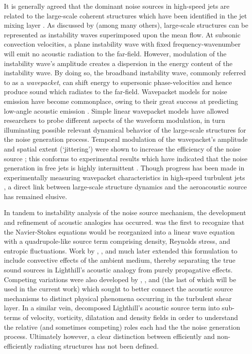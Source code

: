 It is generally agreed that the dominant noise sources in high-speed jets are related to the large-scale coherent structures which have been identified in the jet mixing layer \citep{Arndt1997}. 
As discussed by \citet{Tam1995} (among many others), large-scale structures can be represented as instability waves superimposed upon the mean flow.
At subsonic convection velocities, a plane instability wave with fixed frequency-wavenumber will emit no acoustic radiation to the far-field.
However, modulation of the instability wave's amplitude creates a dispersion in the energy content of the instability wave.
By doing so, the broadband instability wave, commonly referred to as a \emph{wavepacket}, can shift energy to supersonic phase-velocities and hence produce sound which radiates to the far-field.
Wavepacket models for noise emission have become commonplace, owing to their great success at predicting low-angle acoustic emission \citep{Obrist2011}.
Simple linear wavepacket models have allowed researchers to probe different aspects of the waveform modulation, in turn illuminating possible relevant dynamical behavior of the large-scale structures for the noise generation process.
Temporal modulation of the wavepacket's amplitude and spatial extent (`jittering') were shown to increase the efficiency of the noise source \citep{Cavalieri2010}; this conforms to experimental results which have indicated that the noise generation in free jets is highly intermittent \citep{Hileman2005,Kearney-Fischer2013}. 
Though progress has been made in experimentally measuring wavepacket characteristics in high-speed turbulent jets \citep{Cavalieri2013,Baqui2014}, a direct link between large-scale structure dynamics and the aeroacoustic source has remained elusive.

In tandem to instability analysis of the noise source mechanism, the development and refinement of acoustic analogies has occurred. 
\citet{Lighthill1952} was the first to recognize that the Navier-Stokes equations would be reorganized into a linear wave equation with a quadrupole-like source term comprising density, Reynolds stress, and entropic fluctuations.
Work by \citet{Phillips1960}, \citet{Lilley1974}, and much later \citet{Goldstein2003} extended this formulation to include convective effects of the ambient medium, thereby separating the true sound sources in Lighthill's acoustic analogy from purely propagative effects.
Competing variations were also developed by \citet{Powell1964}, \citet{Howe1975}, and \citet{Ribner1962} (the last of which will be used in the current work) which sought to better connect the acoustic source mechanisms to distinct physical phenomena occurring in the turbulent shear layer.
In a similar vein, \citet{Cabana2008} decomposed Lighthill's acoustic source term into sub-terms of velocity, vorticity, dilatation and density fields in order to understand the relative (and sometimes competing) roles each had the the noise generation process.
Ultimately however, a clear distinction between efficiently and non-efficiently radiating structures has not been defined.

